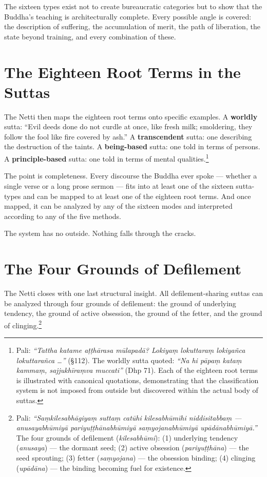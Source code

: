 The sixteen types exist not to create bureaucratic categories but to show that the Buddha's teaching is architecturally complete. Every possible angle is covered: the description of suffering, the accumulation of merit, the path of liberation, the state beyond training, and every combination of these.

\section*{The Eighteen Root Terms in the Suttas}

The Netti then maps the eighteen root terms onto specific examples. A \textbf{worldly} sutta: ``Evil deeds done do not curdle at once, like fresh milk; smoldering, they follow the fool like fire covered by ash.'' A \textbf{transcendent} sutta: one describing the destruction of the taints. A \textbf{being-based} sutta: one told in terms of persons. A \textbf{principle-based} sutta: one told in terms of mental qualities.\footnote{Pali: \textit{``Tattha katame aṭṭhārasa mūlapadā? Lokiyaṃ lokuttaraṃ lokiyañca lokuttarañca \ldots''} (§112). The worldly sutta quoted: \textit{``Na hi pāpaṃ kataṃ kammaṃ, sajjukhīraṃva muccati''} (Dhp 71). Each of the eighteen root terms is illustrated with canonical quotations, demonstrating that the classification system is not imposed from outside but discovered within the actual body of suttas.}

The point is completeness. Every discourse the Buddha ever spoke --- whether a single verse or a long prose sermon --- fits into at least one of the sixteen sutta-types and can be mapped to at least one of the eighteen root terms. And once mapped, it can be analyzed by any of the sixteen modes and interpreted according to any of the five methods.

The system has no outside. Nothing falls through the cracks.

\section*{The Four Grounds of Defilement}

The Netti closes with one last structural insight. All defilement-sharing suttas can be analyzed through four grounds of defilement: the ground of underlying tendency, the ground of active obsession, the ground of the fetter, and the ground of clinging.\footnote{Pali: \textit{``Saṃkilesabhāgiyaṃ suttaṃ catūhi kilesabhūmīhi niddisitabbaṃ --- anusayabhūmiyā pariyuṭṭhānabhūmiyā saṃyojanabhūmiyā upādānabhūmiyā.''} The four grounds of defilement (\textit{kilesabhūmi}): (1) underlying tendency (\textit{anusaya}) --- the dormant seed; (2) active obsession (\textit{pariyuṭṭhāna}) --- the seed sprouting; (3) fetter (\textit{saṃyojana}) --- the obsession binding; (4) clinging (\textit{upādāna}) --- the binding becoming fuel for existence.}

